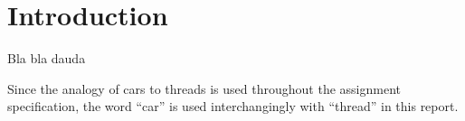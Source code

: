 \section*{Introduction}
Bla bla dauda

Since the analogy of cars to threads is used throughout the assignment specification, the word ``car'' is used interchangingly with ``thread'' in this report.

